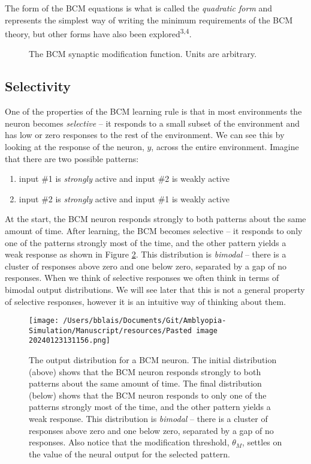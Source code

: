 \documentclass[
]{article}
\providecommand{\tightlist}{%
  \setlength{\itemsep}{0pt}\setlength{\parskip}{0pt}}
\begin{document}
The form of the BCM equations is what is called the \emph{quadratic
form} and represents the simplest way of writing the minimum
requirements of the BCM theory, but other forms have also been
explored\textsuperscript{3,4}.

\begin{figure}
\centering

\caption{The BCM synaptic modification function. Units are
arbitrary.}\label{fig:fig-bcm-phi.svg}
\end{figure}

\subsection{Selectivity}\label{sec:selectivity}

One of the properties of the BCM learning rule is that in most
environments the neuron becomes \emph{selective} -- it responds to a
small subset of the environment and has low or zero responses to the
rest of the environment. We can see this by looking at the response of
the neuron, \(y\), across the entire environment. Imagine that there are
two possible patterns:

\begin{enumerate}
\def\labelenumi{\arabic{enumi}.}
\tightlist
\item
  input \#1 is \emph{strongly} active and input \#2 is weakly active
\item
  input \#2 is \emph{strongly} active and input \#1 is weakly active
\end{enumerate}

At the start, the BCM neuron responds strongly to both patterns about
the same amount of time. After learning, the BCM becomes selective -- it
responds to only one of the patterns strongly most of the time, and the
other pattern yields a weak response as shown in Figure
\ref{fig:output_dist_2d}. This distribution is \emph{bimodal} -- there
is a cluster of responses above zero and one below zero, separated by a
gap of no responses. When we think of selective responses we often think
in terms of bimodal output distributions. We will see later that this is
not a general property of selective responses, however it is an
intuitive way of thinking about them.

\begin{figure}
\centering
\texttt{[image: /Users/bblais/Documents/Git/Amblyopia-Simulation/Manuscript/resources/Pasted image 20240123131156.png]}
\caption{The output distribution for a BCM neuron. The initial
distribution (above) shows that the BCM neuron responds strongly to both
patterns about the same amount of time. The final distribution (below)
shows that the BCM neuron responds to only one of the patterns strongly
most of the time, and the other pattern yields a weak response. This
distribution is \emph{bimodal} -- there is a cluster of responses above
zero and one below zero, separated by a gap of no responses. Also notice
that the modification threshold, \(\theta_M\), settles on the value of
the neural output for the selected pattern.}\label{fig:output_dist_2d}
\end{figure}
\end{document}
